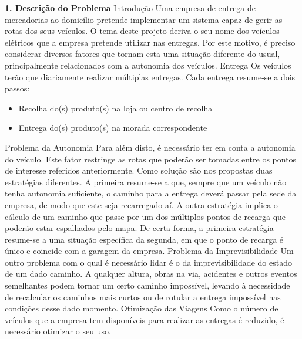 \documentclass[12pt]{article}
\renewcommand{\_}{\kern-1.5pt\textunderscore\kern-1.5pt}
\begin{document}
\vspace{\baselineskip}
{\fontsize{20pt}{24.0pt}\selectfont \textbf{1. Descrição do Problema}}
{\fontsize{16pt}{19.2pt} Introdução}
Uma empresa de entrega de mercadorias ao domicílio pretende implementar um sistema capaz de gerir as rotas dos seus veículos. O tema deste projeto deriva o seu nome dos veículos elétricos que a empresa pretende utilizar nas entregas. Por este motivo, é preciso considerar diversos fatores que tornam esta uma situação diferente do usual, principalmente relacionados com a autonomia dos veículos.
{\fontsize{16pt}{19.2pt} Entrega}
Os veículos terão que diariamente realizar múltiplas entregas. Cada entrega resume-se a dois passos:
\begin{itemize}
	\item Recolha do(s) produto(s) na loja ou centro de recolha
	\item Entrega do(s) produto(s) na morada correspondente
\end{itemize}
{\fontsize{16pt}{19.2pt} Problema da Autonomia}
Para além disto, é necessário ter em conta a autonomia do veículo. Este fator restringe as rotas que poderão ser tomadas entre os pontos de interesse referidos anteriormente. Como solução são nos propostas duas estratégias diferentes. A primeira resume-se a que, sempre que um veículo não tenha autonomia suficiente, o caminho para a entrega deverá passar pela sede da empresa, de modo que este seja recarregado aí. A outra estratégia implica o cálculo de um caminho que passe por um dos múltiplos pontos de recarga que poderão estar espalhados pelo mapa. De certa forma, a primeira estratégia resume-se a uma situação específica da segunda, em que o ponto de recarga é único e coincide com a garagem da empresa.
{\fontsize{16pt}{19.2pt} Problema da Imprevisibilidade}
Um outro problema com o qual é necessário lidar é o da imprevisibilidade do estado de um dado caminho. A qualquer altura, obras na via, acidentes e outros eventos semelhantes podem tornar um certo caminho impossível, levando à necessidade de recalcular os caminhos mais curtos ou de rotular a entrega impossível nas condições desse dado momento.
{\fontsize{16pt}{19.2pt} Otimização das Viagens}
Como o número de veículos que a empresa tem disponíveis para realizar as entregas é reduzido, é necessário otimizar o seu uso.

\vspace{\baselineskip}
\end{document}
